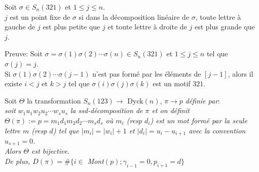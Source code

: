 \begin{lemme} \label{jPtFix}
	Soit $\sigma \in S_{n}(321)$ et $1\leq j \leq n$.\\ $j$ est un point fixe de $\sigma$ si dans la décomposition linéaire de $\sigma$, toute lettre à gauche de $j$ est plus petite que $j$ et toute lettre à droite de $j$ est plus grande que $j$. 
\end{lemme}
Preuve:
Soit $\sigma = \sigma(1)\sigma(2)\cdots \sigma(n) \in S_{n}(321)$ et $1\leq j \leq n$ tel que $\sigma(j)=j$.\\
Si $\sigma(1)\sigma(2)\cdots \sigma(j-1)$ n'est pas formé par les éléments de $[j-1]$, alors il existe $i<j$ et $k>j$ tel que $\sigma(i)\sigma(j)\sigma(k)$ est un motif $321$.\vspace{5pt}\\


\begin{proposition}  \label{dyck_to_avoiding_321_tfsm}
	Soit $\Theta$ la transformation $S_{n}(123) \longrightarrow$ \rm{Dyck}$(n)$, $\pi \longrightarrow p$ \textit{définie par}:\\
	\textit{soit} $w_{1}u_{1}w_{2}u_2 \cdots w_{s}u_{s}$ \textit{la ssd-décomposition de $\pi$ et on définit $\Theta(\pi):=p=m_{1}d_{1}m_{2}d_{2}\cdots m_{s}d_{s}$ où $m_{i}$ (resp $d_{i}$) est un mot formé par la seule lettre $m$ (resp $d$) tel que $|m_{i}| = |w_{i}|+1$ et $|d_{i}| = u_{i}-u_{i+1}$ avec la convention $u_{s+1}=0$.}\\
	\textit{Alors $\Theta$ est bijective.}\\
	\textit{De plus, $D(\pi) = \#\{i\in$ \rm{Mont}$(p)$$;\gamma_{i-1}=0, p_{i+1}=d\}$}
\end{proposition}

